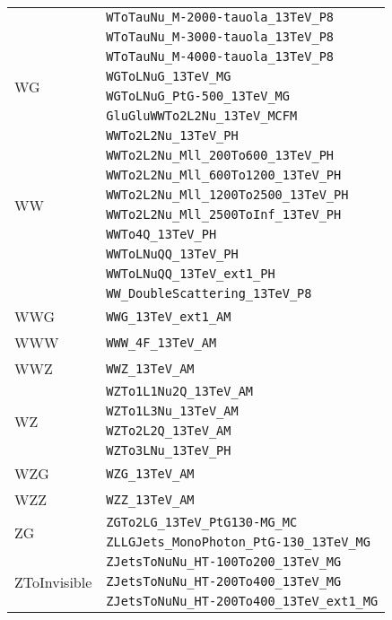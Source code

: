 \begin{longtable}{ll}
 & \texttt{WToTauNu\_M-2000-tauola\_13TeV\_P8} \\
 & \texttt{WToTauNu\_M-3000-tauola\_13TeV\_P8} \\
 & \texttt{WToTauNu\_M-4000-tauola\_13TeV\_P8} \\
\midrule
\multirow{2}{*}{WG} & \texttt{WGToLNuG\_13TeV\_MG} \\
 & \texttt{WGToLNuG\_PtG-500\_13TeV\_MG} \\
\midrule
\multirow{10}{*}{WW} & \texttt{GluGluWWTo2L2Nu\_13TeV\_MCFM} \\
 & \texttt{WWTo2L2Nu\_13TeV\_PH} \\
 & \texttt{WWTo2L2Nu\_Mll\_200To600\_13TeV\_PH} \\
 & \texttt{WWTo2L2Nu\_Mll\_600To1200\_13TeV\_PH} \\
 & \texttt{WWTo2L2Nu\_Mll\_1200To2500\_13TeV\_PH} \\
 & \texttt{WWTo2L2Nu\_Mll\_2500ToInf\_13TeV\_PH} \\
 & \texttt{WWTo4Q\_13TeV\_PH} \\
 & \texttt{WWToLNuQQ\_13TeV\_PH} \\
 & \texttt{WWToLNuQQ\_13TeV\_ext1\_PH} \\
 & \texttt{WW\_DoubleScattering\_13TeV\_P8} \\
\midrule
\multirow{1}{*}{WWG} & \texttt{WWG\_13TeV\_ext1\_AM} \\
\midrule
\multirow{1}{*}{WWW} & \texttt{WWW\_4F\_13TeV\_AM} \\
\midrule
\multirow{1}{*}{WWZ} & \texttt{WWZ\_13TeV\_AM} \\
\midrule
\multirow{4}{*}{WZ} & \texttt{WZTo1L1Nu2Q\_13TeV\_AM} \\
 & \texttt{WZTo1L3Nu\_13TeV\_AM} \\
 & \texttt{WZTo2L2Q\_13TeV\_AM} \\
 & \texttt{WZTo3LNu\_13TeV\_PH} \\
\midrule
\multirow{1}{*}{WZG} & \texttt{WZG\_13TeV\_AM} \\
\midrule
\multirow{1}{*}{WZZ} & \texttt{WZZ\_13TeV\_AM} \\
\midrule
\multirow{2}{*}{ZG} & \texttt{ZGTo2LG\_13TeV\_PtG130-MG\_MC} \\
 & \texttt{ZLLGJets\_MonoPhoton\_PtG-130\_13TeV\_MG} \\
\midrule
\multirow{5}{*}{ZToInvisible} & \texttt{ZJetsToNuNu\_HT-100To200\_13TeV\_MG} \\
 & \texttt{ZJetsToNuNu\_HT-200To400\_13TeV\_MG} \\
 & \texttt{ZJetsToNuNu\_HT-200To400\_13TeV\_ext1\_MG} \\

\end{longtable}
